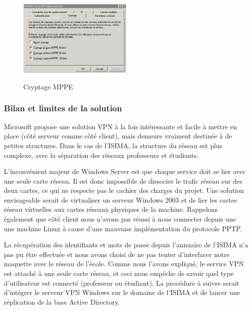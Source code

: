 \begin{figure}[H]
	\begin{center}
		\includegraphics[width=0.50\textwidth]{partie_2/screen_windows/cryptage.PNG}\\
	\end{center}
	\caption{Cryptage MPPE}
	\label{VPN_CRYPTAGE}
\end{figure}


\subsubsection{Bilan et limites de la solution}

Microsoft propose une solution VPN à la fois intéressante et facile à mettre en place (côté serveur comme côté client), mais demeure vraiment destinée à de petites structures. Dans le cas de l'ISIMA, la structure du réseau est plus complexe, avec la séparation des réseaux professeurs et étudiants.

L'inconvénient majeur de Windows Server est que chaque service doit se lier avec une seule carte réseau. Il est donc impossible de dissocier le trafic réseau sur des deux cartes, ce qui ne respecte pas le cachier des charges du projet. Une solution envisageable serait de virtualiser un serveur Windows 2003 et de lier les cartes réseau virtuelles aux cartes réseaux physiques de la machine. Rappelons également que côté client nous n'avons pas réussi à nous connecter depuis une une machine Linux à cause d'une mauvaise implémentation du protocole PPTP.

La récupération des identifiants et mots de passe depuis l'annuaire de l'ISIMA n'a pas pu être effectuée et nous avons choisi de ne pas tenter d'interfacer notre maquette avec le réseau de l'école. Comme nous l'avons expliqué, le service VPN est attaché à une seule carte réseau, et ceci nous empêche de savoir quel type d'utilisateur est connecté (professeur ou étudiant). La procédure à suivre serait d'intégrer le serveur VPN Windows sur le domaine de l'ISIMA et de lancer une réplication de la base Active Directory.

